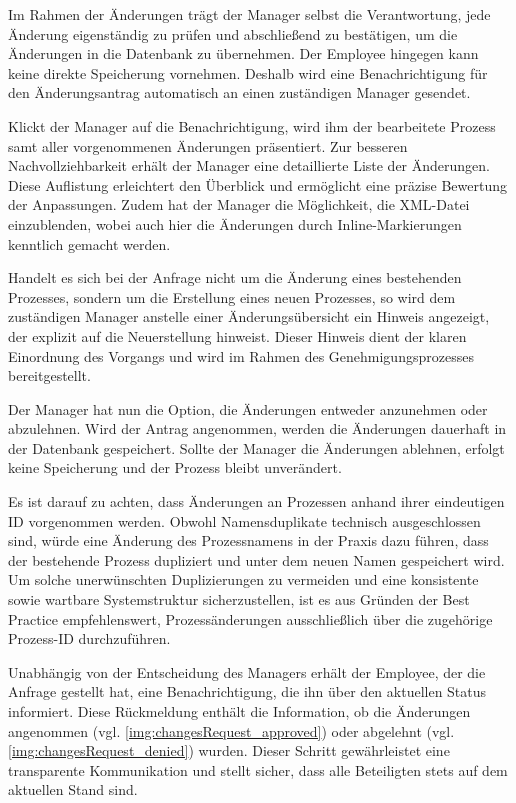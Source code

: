
Im Rahmen der Änderungen trägt der Manager selbst die Verantwortung, jede Änderung eigenständig zu prüfen und abschließend zu bestätigen, um die Änderungen in die Datenbank zu übernehmen. Der Employee hingegen kann keine direkte Speicherung vornehmen. Deshalb wird eine Benachrichtigung für den Änderungsantrag automatisch an einen zuständigen Manager gesendet. 


Klickt der Manager auf die Benachrichtigung, wird ihm der bearbeitete Prozess samt aller vorgenommenen Änderungen präsentiert. Zur besseren Nachvollziehbarkeit erhält der Manager eine detaillierte Liste der Änderungen. Diese Auflistung erleichtert den Überblick und ermöglicht eine präzise Bewertung der Anpassungen. Zudem hat der Manager die Möglichkeit, die XML-Datei einzublenden, wobei auch hier die Änderungen durch Inline-Markierungen kenntlich gemacht werden.


Handelt es sich bei der Anfrage nicht um die Änderung eines bestehenden Prozesses, sondern um die Erstellung eines neuen Prozesses, so wird dem zuständigen Manager anstelle einer Änderungsübersicht ein Hinweis angezeigt, der explizit auf die Neuerstellung hinweist. Dieser Hinweis dient der klaren Einordnung des Vorgangs und wird im Rahmen des Genehmigungsprozesses bereitgestellt.


Der Manager hat nun die Option, die Änderungen entweder anzunehmen oder abzulehnen. Wird der Antrag angenommen, werden die Änderungen dauerhaft in der Datenbank gespeichert. Sollte der Manager die Änderungen ablehnen, erfolgt keine Speicherung und der Prozess bleibt unverändert.

Es ist darauf zu achten, dass Änderungen an Prozessen anhand ihrer eindeutigen \ac{ID} vorgenommen werden. Obwohl Namensduplikate technisch ausgeschlossen sind, würde eine Änderung des Prozessnamens in der Praxis dazu führen, dass der bestehende Prozess dupliziert und unter dem neuen Namen gespeichert wird. Um solche unerwünschten Duplizierungen zu vermeiden und eine konsistente sowie wartbare Systemstruktur sicherzustellen, ist es aus Gründen der Best Practice empfehlenswert, Prozessänderungen ausschließlich über die zugehörige Prozess-\ac{ID} durchzuführen.

Unabhängig von der Entscheidung des Managers erhält der Employee, der die Anfrage gestellt hat, eine Benachrichtigung, die ihn über den aktuellen Status informiert. Diese Rückmeldung enthält die Information, ob die Änderungen angenommen (vgl. \autoref{img:changesRequest_approved}) oder abgelehnt (vgl. \autoref{img:changesRequest_denied}) wurden. Dieser Schritt gewährleistet eine transparente Kommunikation und stellt sicher, dass alle Beteiligten stets auf dem aktuellen Stand sind.

